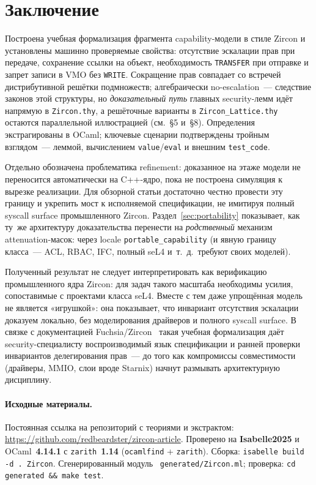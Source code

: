 \documentclass[11pt,a4paper]{article}
\begin{document}
\section{Заключение}
\label{sec:conclusion}

Построена учебная формализация фрагмента \textenglish{capability}-модели в стиле Zircon
и установлены машинно проверяемые свойства: отсутствие эскалации прав при
передаче, сохранение ссылки на объект, необходимость \texttt{TRANSFER}
при отправке и запрет записи в VMO без \texttt{WRITE}. Сокращение прав
совпадает со встречей дистрибутивной решётки подмножеств; алгебраически
no-escalation~--- следствие законов этой структуры, но
\emph{доказательный путь} главных security-лемм идёт напрямую в
\texttt{Zircon.thy}, а решёточные варианты в \texttt{Zircon\_Lattice.thy}
остаются параллельной иллюстрацией (см.~§5 и~§8). Определения
экстрагированы в OCaml; ключевые сценарии подтверждены тройным
взглядом~--- леммой, вычислением \texttt{value}/\texttt{eval} и внешним
\texttt{test\_code}.

Отдельно обозначена проблематика refinement: доказанное на этаже модели
не переносится автоматически на C++-ядро, пока не построена симуляция к
вырезке реализации. Для обзорной статьи достаточно честно провести эту
границу и укрепить мост к исполняемой спецификации, не имитируя полный
syscall surface промышленного Zircon. Раздел~\ref{sec:portability}
показывает, как ту~же архитектуру доказательства перенести на
\emph{родственный} механизм attenuation-масок: через locale
\texttt{portable\_capability} (и явную границу класса~--- ACL, RBAC,
IFC, полный seL4 и~т.~д.\ требуют своих моделей).

Полученный результат не следует интерпретировать как верификацию
промышленного ядра Zircon: для задач такого масштаба необходимы усилия,
сопоставимые с проектами класса seL4. Вместе с тем даже упрощённая модель
не является «игрушкой»: она показывает, что инвариант отсутствия эскалации
доказуем локально, без моделирования драйверов и полного syscall surface.
В связке с документацией Fuchsia/Zircon~\cite{zircon_handles,zircon_rights}
такая учебная формализация даёт security-специалисту воспроизводимый язык
спецификации и ранней проверки инвариантов делегирования прав~--- до того
как компромиссы совместимости (драйверы, MMIO, слои вроде Starnix)
начнут размывать архитектурную дисциплину.

\paragraph{Исходные материалы.}
Постоянная ссылка на репозиторий с теориями и экстрактом:
\url{https://github.com/redbeardster/zircon-article}.
Проверено на \textbf{Isabelle2025} и OCaml~\textbf{4.14.1} с
\texttt{zarith}~\textbf{1.14} (\texttt{ocamlfind} + \texttt{zarith}).
Сборка: \texttt{isabelle build -d . Zircon}. Сгенерированный модуль~
\texttt{generated/Zircon.ml}; проверка:
\texttt{cd generated \&\& make test}.
\end{document}
